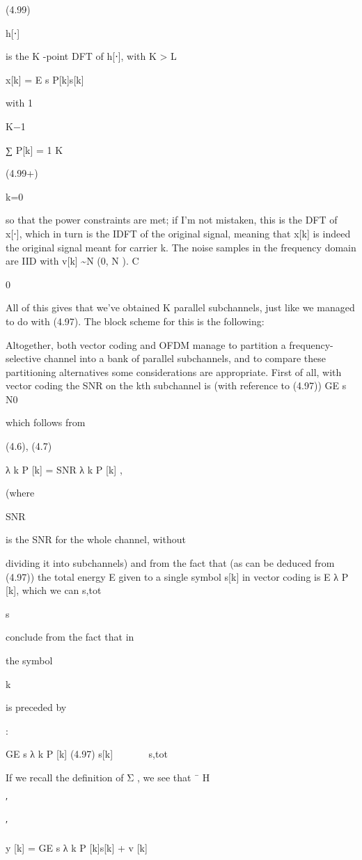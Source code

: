 {{{{{(4.99)

h[⋅]

is the K -point DFT of h[⋅], with K > L

x[k] = \sqrt E s P[k]s[k]

with 1

K−1

∑ P[k] = 1 K

(4.99+)

k=0

so that the power constraints are met; if I'm not mistaken, this is the DFT of x[⋅],
which in turn is the IDFT of the original signal, meaning that x[k] is indeed the original signal meant for carrier k.
The noise samples in the frequency domain are IID with v[k] \sim N (0, N ).
C

0

All of this gives that we've obtained K parallel subchannels, just like we managed to do with (4.97). The block scheme for this is the following:

Altogether, both vector coding and OFDM manage to partition a frequency-selective channel into a bank of parallel subchannels, and to compare these partitioning alternatives some considerations are appropriate.
First of all, with vector coding the SNR on the kth subchannel is (with reference to
(4.97))
GE s N0

which follows from

(4.6), (4.7)

λ k P [k] = SNR λ k P [k] ,

(where

SNR

is the SNR for the whole channel, without

dividing it into subchannels) and from the fact that (as can be deduced from (4.97)) the total energy E given to a single symbol s[k] in vector coding is E λ P [k], which we can s,tot

s

conclude from the fact that in

the symbol

k

is preceded by

:

\sqrt G\sqrt E s λ k P [k]
(4.97)
s[k]





\sqrtE s,tot

If we recall the definition of Σ , we see that
¯
H

′

′

y [k] = \sqrt GE s \sqrt λ k P [k]s[k] + v [k]

}}}}}
